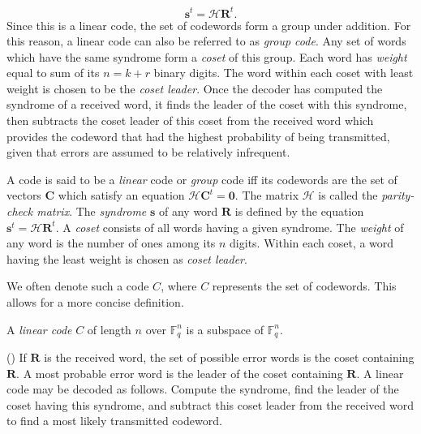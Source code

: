 \begin{example}
    \[
        \textbf{s}^t = \mathscr{H}\textbf{R}^t.
    \]
    Since this is a linear code, the set of codewords form a group under addition. For this reason, a linear code can also be referred to as \textit{group code}. Any set of words which have the same syndrome form a \textit{coset} of this group. Each word has \textit{weight} equal to sum of its $n = k + r$ binary digits. The word within each coset with least weight is chosen to be the \textit{coset leader}. Once the decoder has computed the syndrome of a received word, it finds the leader of the coset with this syndrome, then subtracts the coset leader of this coset from the received word which provides the codeword that had the highest probability of being transmitted, given that errors are assumed to be relatively infrequent.
\end{example}
    
\begin{definition}\label{lineardef}
    A code is said to be a \textit{linear} code or \textit{group} code iff its codewords are the set of vectors $\textbf{C}$ which satisfy an equation $\mathscr{H}\textbf{C}^t = \textbf{0}$. The matrix $\mathscr{H}$ is called the \textit{parity-check matrix}. The \textit{syndrome} $\textbf{s}$ of any word $\textbf{R}$ is defined by the equation $\textbf{s}^t = \mathscr{H}\textbf{R}^t$. A \textit{coset} consists of all words having a given syndrome. The \textit{weight} of any word is the number of ones among its $n$ digits. Within each coset, a word having the least weight is chosen as \textit{coset leader}.
\end{definition}

We often denote such a code $C$, where $C$ represents the set of codewords. This allows for a more concise definition.

\begin{definition}
    A \textit{linear code} $C$ of length $n$ over $\mathbb{F}_q^n$ is a subspace of $\mathbb{F}_q^n$.
\end{definition}

\begin{theorem} (\cite{berlekamp})
    If $\textbf{R}$ is the received word, the set of possible error words is the coset containing $\textbf{R}$. A most probable error word is the leader of the coset containing $\textbf{R}$. A linear code may be decoded as follows. Compute the syndrome, find the leader of the coset having this syndrome, and subtract this coset leader from the received word to find a most likely transmitted codeword.
\end{theorem}


